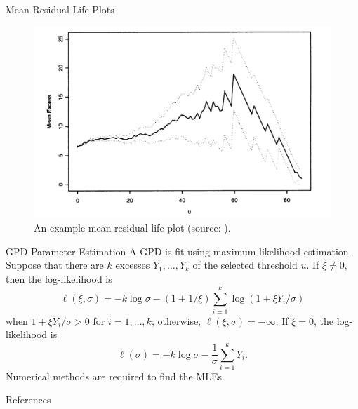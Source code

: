 \documentclass{beamer}
\begin{document}
\begin{frame}{Mean Residual Life Plots}
    \begin{figure}
        \centering
        \includegraphics[scale=0.35]{mean_residual_life_plot.png}
        \caption{An example mean residual life plot (source: \cite{coles_2001}).}
        \label{fig:mean_residual_life_plot}
    \end{figure}
\end{frame}

\begin{frame}{GPD Parameter Estimation}
    A GPD is fit using maximum likelihood estimation. Suppose that there are $k$ excesses $Y_1, \ldots, Y_k$ of the selected threshold $u$. If $\xi \ne 0$, then the log-likelihood is
    \[
    \ell(\xi, \sigma) = -k\log\sigma - (1 + 1 / \xi)\sum_{i = 1}^k \log(1 + \xi Y_i / \sigma)
    \]
    when $1 + \xi Y_i / \sigma > 0$ for $i = 1, \ldots, k$; otherwise, $\ell(\xi, \sigma) = -\infty$. If $\xi = 0$, the log-likelihood is
    \[
    \ell(\sigma) = -k\log\sigma - \frac{1}{\sigma}\sum_{i = 1}^k Y_i.
    \]
    Numerical methods are required to find the MLEs.
\end{frame}

\begin{frame}{References}
    \nocite{*}
    \printbibliography
\end{frame}
\end{document}
